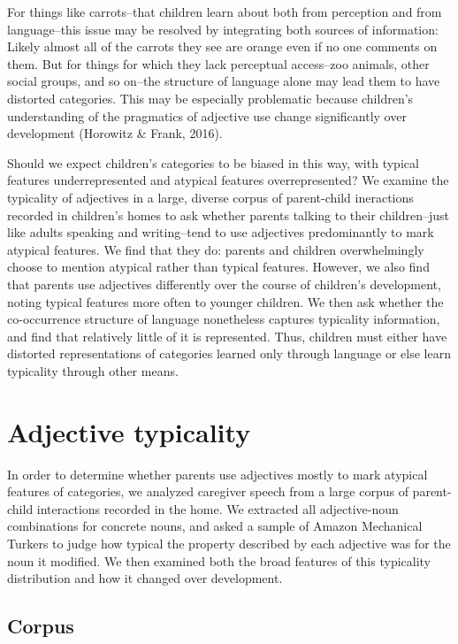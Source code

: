 \documentclass[10pt, letterpaper]{article}
\begin{document}
For things like carrots--that children learn about both from perception
and from language--this issue may be resolved by integrating both
sources of information: Likely almost all of the carrots they see are
orange even if no one comments on them. But for things for which they
lack perceptual access--zoo animals, other social groups, and so on--the
structure of language alone may lead them to have distorted categories.
This may be especially problematic because children's understanding of
the pragmatics of adjective use change significantly over development
(Horowitz \& Frank, 2016).

Should we expect children's categories to be biased in this way, with
typical features underrepresented and atypical features overrepresented?
We examine the typicality of adjectives in a large, diverse corpus of
parent-child ineractions recorded in children's homes to ask whether
parents talking to their children--just like adults speaking and
writing--tend to use adjectives predominantly to mark atypical features.
We find that they do: parents and children overwhelmingly choose to
mention atypical rather than typical features. However, we also find
that parents use adjectives differently over the course of children's
development, noting typical features more often to younger children. We
then ask whether the co-occurrence structure of language nonetheless
captures typicality information, and find that relatively little of it
is represented. Thus, children must either have distorted
representations of categories learned only through language or else
learn typicality through other means.

\hypertarget{adjective-typicality}{%
\section{Adjective typicality}\label{adjective-typicality}}

In order to determine whether parents use adjectives mostly to mark
atypical features of categories, we analyzed caregiver speech from a
large corpus of parent-child interactions recorded in the home. We
extracted all adjective-noun combinations for concrete nouns, and asked
a sample of Amazon Mechanical Turkers to judge how typical the property
described by each adjective was for the noun it modified. We then
examined both the broad features of this typicality distribution and how
it changed over development.

\hypertarget{corpus}{%
\subsection{Corpus}\label{corpus}}
\end{document}
